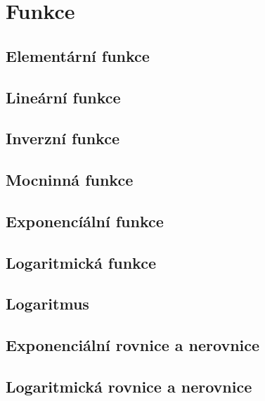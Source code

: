 
\newpage
    \section{Funkce}
        \subsection{Elementární funkce}
        \subsection{Lineární funkce}
        \subsection{Inverzní funkce}
        \subsection{Mocninná funkce}
        \subsection{Exponencíální funkce}
        \subsection{Logaritmická funkce}
        \subsection{Logaritmus}
        \subsection{Exponenciální rovnice a nerovnice}
        \subsection{Logaritmická rovnice a nerovnice}
